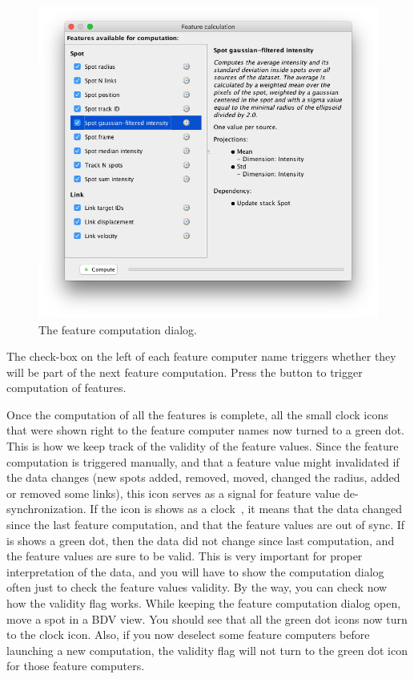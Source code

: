 \begin{figure}
    \centering
    \includegraphics[height=0.3\textheight]{figures/Mastodon_FeatureComputation_1.png}
    
    \caption{The feature computation dialog. }
    \label{fig:FeatureComputationDialog}
\end{figure}

The check-box on the left of each feature computer name triggers whether they will be part of the next feature computation.
Press the  button to trigger computation of features.

Once the computation of all the features is complete, all the small clock icons that were shown right to the feature computer names now turned to a green dot.
This is how we keep track of the validity of the feature values.
Since the feature computation is triggered manually, and that a feature value might invalidated if the data changes (new spots added, removed, moved, changed the radius, added or removed some links), this icon serves as a signal for feature value de-synchronization.     
If the icon is shows as a clock~, it means that the data changed since the last feature computation, and that the feature values are out of sync. 
If is shows a green dot, then the data did not change since last computation, and the feature values are sure to be valid. 
This is very important for proper interpretation of the data, and you will have to show the computation dialog often just to check the feature values validity. 
By the way, you can check now how the validity flag works. 
While keeping the feature computation dialog open, move a spot in a BDV view. 
You should see that all the green dot icons now turn to the clock icon.
Also, if you now deselect some feature computers before launching a new computation, the validity flag will not turn to the green dot icon for those feature computers.

